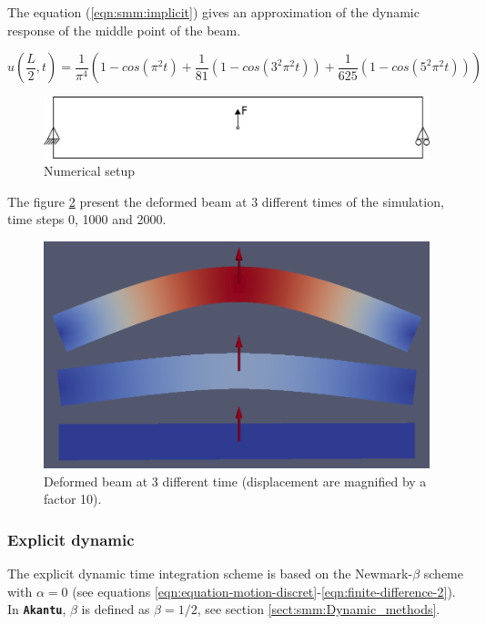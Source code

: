 \documentclass[a4paper,11pt]{book}
\newcommand{\akantu}{{\texttt{\textbf{Akantu}}}\xspace}
\begin{document}
The  equation (\ref{eqn:smm:implicit})  gives  an approximation  of the  dynamic
response of the middle point of the beam.

\begin{equation}\label{eqn:smm:implicit}
  u(\frac{L}{2}, t) = \frac{1}{\pi^4} (1 - cos(\pi^2 t) +
  \frac{1}{81}(1 - cos(3^2 \pi^2 t)) +
  \frac{1}{625}(1 - cos(5^2 \pi^2 t)))
\end{equation}

\begin{figure}[!htb]
  \centering
  \includegraphics[scale=.6]{figures/implicit_dynamic}
  \caption{Numerical setup}
  \label{fig:smm:implicit:dynamic}
\end{figure}

The figure \ref{fig:smm:implicit:dynamic_solution}  present the deformed beam at
3 different times of the simulation, time steps 0, 1000 and 2000.

\begin{figure}[!htb]
  \centering
  \includegraphics[width=.6\linewidth]{figures/dynamic_analysis}
  \caption{Deformed beam at 3 different time (displacement are
    magnified by a factor 10).}
  \label{fig:smm:implicit:dynamic_solution}
\end{figure}

\subsubsection{Explicit dynamic}

The explicit  dynamic time  integration scheme is  based on  the Newmark-$\beta$
scheme            with            $\alpha=0$           (see            equations
\ref{eqn:equation-motion-discret}-\ref{eqn:finite-difference-2}).   In  \akantu,
$\beta$ is defined as $\beta=1/2$, see section \ref{sect:smm:Dynamic_methods}.
\end{document}

